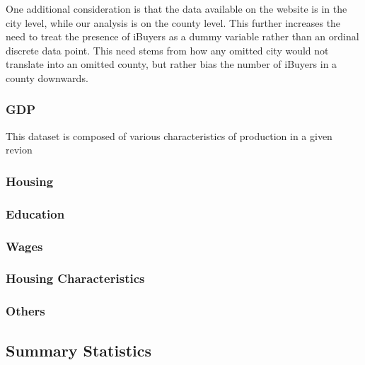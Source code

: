 One additional consideration is that the data available on the website is in the city level, while our analysis is on the county level. This further increases the need to treat the presence of iBuyers as a dummy variable rather than an ordinal discrete data point. This need stems from how any omitted city would not translate into an omitted county, but rather bias the number of iBuyers in a county downwards.

\subsubsection{GDP}
This dataset is composed of various characteristics of production in a given revion

\subsubsection{Housing}\label{subsubsec_housing}

\subsubsection{Education}

\subsubsection{Wages}

\subsubsection{Housing Characteristics}

\subsubsection{Others} 

\subsection{Summary Statistics}\label{subsection_summary_statistics}
